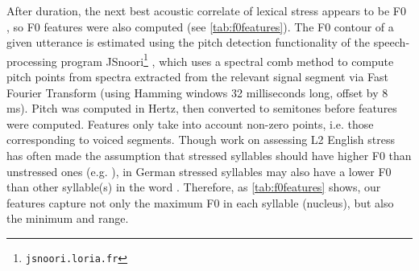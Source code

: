 \documentclass[a4paper]{article}
\begin{document}
	   After duration, the next best acoustic correlate of lexical stress appears to be F0 \cite{Dogil1999}, so F0 features were also computed (see \cref{tab:f0features}).
	    The F0 contour of a given utterance is estimated using the pitch detection functionality of the speech-processing program JSnoori\footnote{\texttt{jsnoori.loria.fr}} \cite{DiMartino1999}, which uses a spectral comb method to compute pitch points from spectra
	    extracted from the relevant signal segment %
	    via Fast Fourier Transform (using Hamming windows 32 milliseconds long, offset by 8 ms). Pitch was computed in Hertz, then converted to semitones before features were computed. Features only take into account non-zero points, i.e. those corresponding to voiced segments.
	    Though work on assessing L2 English stress has often made the assumption that stressed syllables should have higher F0 than unstressed ones (e.g. \cite{Bonneau2011}), in German stressed syllables may also have a lower F0 than other syllable(s) in the word \cite[p.~267]{Cutler2005}. Therefore, as \cref{tab:f0features} shows, our features capture not only the maximum F0 in each syllable (nucleus), but also the minimum and range. %
	    
\end{document}

